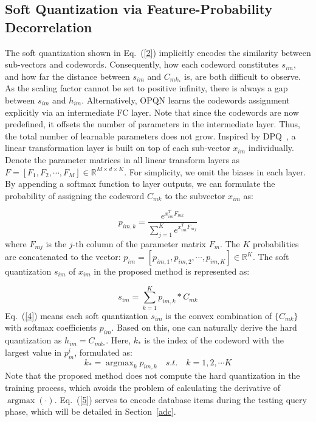 \documentclass{elsarticle}
\DeclareMathOperator*{\argmax}{argmax}
\begin{document}
\subsection{Soft Quantization via Feature-Probability Decorrelation} \label{subsec:a}
The soft quantization shown in Eq.~(\ref{2}) implicitly encodes the similarity between sub-vectors and codewords. Consequently, how each codeword constitutes $s_{im}$, and how far the distance between $s_{im}$ and $C_{mk_{*}}$ is, are both difficult to observe. As the scaling factor cannot be set to positive infinity, there is always a gap between $s_{im}$ and $h_{im}$. Alternatively, OPQN learns the codewords assignment explicitly via an intermediate FC layer. Note that since the codewords are now predefined, it offsets the number of parameters in the intermediate layer. Thus, the total number of learnable parameters does not grow. Inspired by DPQ~\cite{klein2019end}, a linear transformation layer is built on top of each sub-vector $x_{im}$ individually. Denote the parameter matrices in all linear transform layers as $F=[F_{1}, F_{2},\cdots,F_{M}] \in \mathbb{R}^{M \times d \times K}$. For simplicity, we omit the biases in each layer. By appending a softmax function to layer outputs, we can formulate the probability of assigning the codeword $C_{mk}$ to the subvector ${x_{im}}$ as:

\begin{equation} \label{3}
    p_{im,k} = \frac{e^{x_{im}^T F_{mk}}}{\sum_{j=1}^{K}e^{x_{im}^T F_{mj}}}
\end{equation}
where $F_{mj}$ is the $j$-th column of the parameter matrix $F_m$. The $K$ probabilities are concatenated to the vector: $p_{im}= [p_{im, 1}, p_{im,2},\cdots,p_{im,K}] \in \mathbb{R}^{K}$. The soft quantization $s_{im}$ of $x_{im}$ in the proposed method is represented as: 

\begin{equation} \label{4}
    s_{im}= \sum_{k=1}^{K} p_{im,k} * C_{mk}
\end{equation}
Eq.~(\ref{4}) means each soft quantization $s_{im}$ is the convex combination of $\{C_{mk}\}$ with softmax coefficients $p_{im}$. Based on this, one can naturally derive the hard quantization as $h_{im}=C_{mk_{*}}$. Here, $k_{*}$ is the index of the codeword with the largest value in $p_{m}^i$, formulated as:
\begin{equation} \label{5}
    k_* = \argmax_{k} p_{im,k} \quad s.t. \quad k =1, 2,\cdots K
\end{equation}
Note that the proposed method does not compute the hard quantization in the training process, which avoids the problem of calculating the derivative of $\argmax(\cdot)$. Eq.~(\ref{5}) serves to encode database items during the testing query phase, which will be detailed in Section~\ref{adc}.
\end{document}
